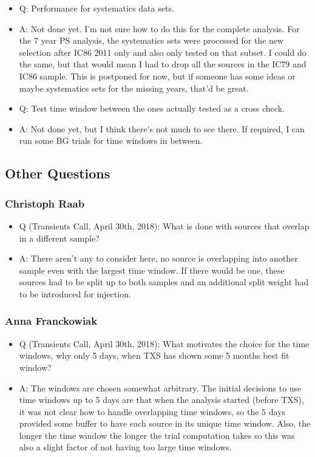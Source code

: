 \begin{itemize}
      \item Q:
        Performance for systematics data sets.
      \item A:
        \textcolor{nordorange}{Not done yet}.
        I'm not sure how to do this for the complete analysis.
        For the 7 year PS analysis, the systematics sets were processed for the new selection after IC86 2011 only and also only tested on that subset.
        I could do the same, but that would mean I had to drop all the sources in the IC79 and IC86 sample.
        This is postponed for now, but if someone has some ideas or maybe systematics sets for the missing years, that'd be great.

      \item Q:
        Test time window between the ones actually tested as a cross check.
      \item A:
        \textcolor{nordorange}{Not done yet}, but I think there's not much to see there.
        If required, I can run some BG trials for time windows in between.
  \end{itemize}

\subsection*{Other Questions}
\subsubsection*{Christoph Raab}
  \begin{itemize}
      \item Q (Transients Call, April 30th, 2018):
        What is done with sources that overlap in a different sample?
      \item A:
        There aren't any to consider here, no source is overlapping into another sample even with the largest time window.
        If there would be one, these sources had to be split up to both samples and an additional split weight had to be introduced for injection.
  \end{itemize}

\subsubsection*{Anna Franckowiak}
  \begin{itemize}
      \item Q (Transients Call, April 30th, 2018):
        What motivates the choice for the time windows, why only 5 days, when TXS has shown some 5 months best fit window?
      \item A:
        The windows are chosen somewhat arbitrary.
        The initial decisions to use time windows up to 5 days are that when the analysis started (before TXS), it was not clear how to handle overlapping time windows, so the 5 days provided some buffer to have each source in its unique time window.
        Also, the longer the time window the longer the trial computation takes so this was also a slight factor of not having too large time windows.
  \end{itemize}


